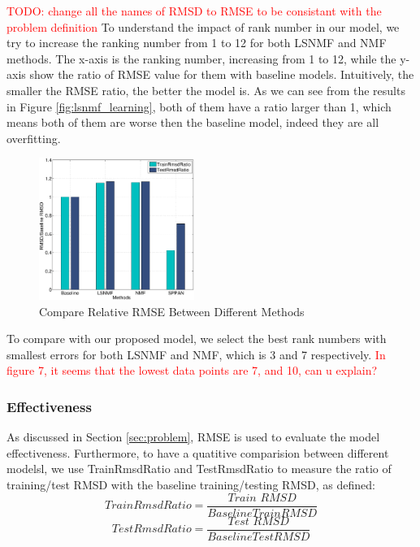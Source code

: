 \textcolor{red}{TODO:  change all the names of RMSD to RMSE to be consistant with the problem definition}
To understand the impact of rank number in our model, we try to increase the ranking number from 1 to 12 for  both LSNMF and NMF methods.
The x-axis is the ranking number, increasing from 1 to 12, while the y-axis show the ratio of RMSE value for them with baseline models. Intuitively, the smaller the RMSE ratio, the better the model is.  As we can see from the results in Figure \ref{fig:lsnmf_learning},  both of them have a ratio larger than 1, which means both of them are worse then the baseline model, indeed they are all overfitting. 


\begin{figure}[!ht]
  \centering
  \includegraphics[width=0.45\textwidth]{figures/methos_comparison_all_relative.eps}
  \caption{Compare Relative RMSE Between Different Methods}
  \label{fig:rmsd_compare}
\end{figure}

To compare with our proposed {\sppan} model, we select the best rank
numbers with smallest errors for both LSNMF and NMF, which is 3 and 7 respectively.
\textcolor{red}{In figure 7, it seems that the lowest data points are 7, and 10, can u explain?}


\subsubsection{Effectiveness}

As discussed in Section \ref{sec:problem}, RMSE is used to evaluate the model effectiveness. Furthermore, to have a quatitive comparision between different modelsl, we use TrainRmsdRatio and TestRmsdRatio to measure the ratio of training/test RMSD with the baseline training/testing RMSD, as defined: 
\[
TrainRmsdRatio=\frac{\textit{Train RMSD}}{Baseline Train RMSD}
\]
\[
TestRmsdRatio=\frac{\textit{Test RMSD}}{Baseline Test RMSD}
\]



